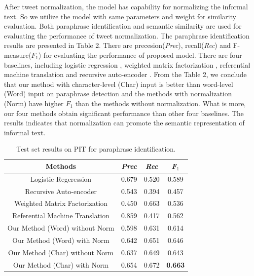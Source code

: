 \documentclass[letterpaper]{article}
\begin{document}
After tweet normalization, the model has capability for normalizing the informal text. So we utilize the model with same parameters and weight for similarity evaluation. Both paraphrase identification and semantic similarity are used for evaluating the performance of tweet normalization. The paraphrase identification results are presented in Table 2. There are precesion(\textit{Prec}), recall(\textit{Rec}) and F-measure(\textit{$F_{1}$}) for evaluating the performance of proposed model. There are four baselines, including logistic regression \cite{das-smith:2009:ACLIJCNLP}, weighted matrix factorization \cite{guo-diab:2012:ACL2012}, referential machine translation \cite{bicici:2015:SemEval} and recursive auto-encoder \cite{NIPS2011_4204}. From the Table 2, we conclude that our method with character-level (Char) input is better than word-level (Word) input on paraphrase detection and the methods with normalization (Norm) have higher \textit{$F_{1}$} than the methods without normalization. What is more, our four methods obtain significant performance than other four baselines. The results indicates that normalization can promote the semantic representation of informal text.

\begin{table}
	\begin{center}
		\begin{tabular}{| c | c | c | c | }
			\hline
			\bf Methods & \bf \textit{Prec} & \bf \textit{Rec}  &\bf  \textit{F}$_{1}$ \\ \hline
			Logistic Regeression  & 0.679 & 0.520 & 0.589  \\ \hline
			Recursive Auto-encoder  & 0.543 & 0.394 & 0.457  \\ 
			\hline
			Weighted Matrix Factorization & 0.450 & 0.663 & 0.536  \\ 
			\hline
			Referential Machine Translation  & 0.859 & 0.417 & 0.562  \\ 
			\hline
			Our Method (Word) without Norm& 0.598 & 0.631 & 0.614  \\ 
			\hline
			Our Method (Word) with Norm & 0.642 & 0.651 & 0.646  \\ 
			\hline
			Our Method (Char) without Norm & 0.637 & 0.649 & 0.643  \\ 
			\hline
			Our Method (Char) with Norm & 0.654 & 0.672 & \bf 0.663  \\ 
			\hline
		\end{tabular}
		\caption{Test set results on PIT for paraphrase identification.}
	\end{center}
\end{table}
\end{document}
